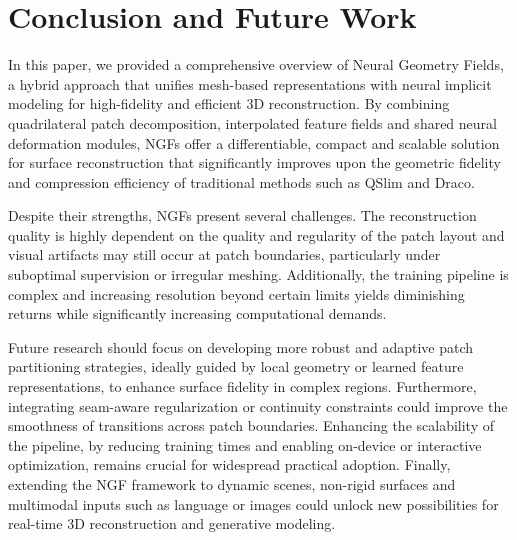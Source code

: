 \section{Conclusion and Future Work}\label{Sec:ConclusionAndFutureWork}

In this paper, we provided a comprehensive overview of Neural Geometry Fields, a hybrid approach that unifies mesh-based representations with neural implicit modeling for high-fidelity and efficient 3D reconstruction.
By combining quadrilateral patch decomposition, interpolated feature fields and shared neural deformation modules, NGFs offer a differentiable, compact and scalable solution for surface reconstruction that significantly improves upon the geometric fidelity and compression efficiency of traditional methods such as QSlim and Draco.

Despite their strengths, NGFs present several challenges.
The reconstruction quality is highly dependent on the quality and regularity of the patch layout and visual artifacts may still occur at patch boundaries, particularly under suboptimal supervision or irregular meshing.
Additionally, the training pipeline is complex and increasing resolution beyond certain limits yields diminishing returns while significantly increasing computational demands.

Future research should focus on developing more robust and adaptive patch partitioning strategies, ideally guided by local geometry or learned feature representations, to enhance surface fidelity in complex regions.
Furthermore, integrating seam-aware regularization or continuity constraints could improve the smoothness of transitions across patch boundaries.
Enhancing the scalability of the pipeline, by reducing training times and enabling on-device or interactive optimization, remains crucial for widespread practical adoption.
Finally, extending the NGF framework to dynamic scenes, non-rigid surfaces and multimodal inputs such as language or images could unlock new possibilities for real-time 3D reconstruction and generative modeling.
